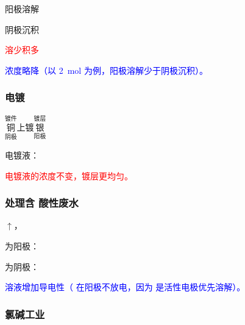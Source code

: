 


            阳极溶解


            阴极沉积

            \textcolor{red}{溶少积多}

            \textcolor{blue}{ 浓度略降（以 \SI{2}{\mole}  为例，阳极溶解少于阴极沉积）。}

        \subsubsection{电镀}\label{subsubsec:电镀}

            \(\overset{\text{镀件}}{\underset{\text{阴极}}{\text{铜}}}\)上镀\(\overset{\text{镀层}}{\underset{\text{阳极}}{\text{银}}}\)

            电镀液：

            \textcolor{red}{电镀液的浓度不变，镀层更均匀。}

        \subsubsection{处理含 \texorpdfstring{}{重铬酸根} 酸性废水}\label{subsubsec:废水处理}



            \(\uparrow\)，

             为阳极：

             为阴极：

            \textcolor{blue}{ 溶液增加导电性（ 在阳极不放电，因为  是活性电极优先溶解）。}

        \subsubsection{氯碱工业}\label{subsubsec:氯碱工业}

            \begin{center}
            
            \end{center}

